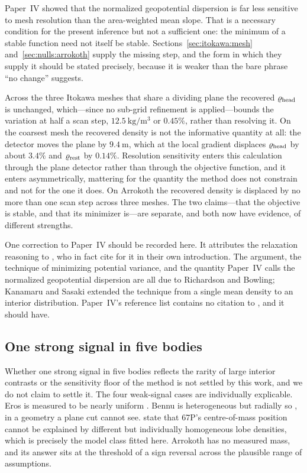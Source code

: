 Paper~IV showed that the normalized geopotential dispersion is far less
sensitive to mesh resolution than the area-weighted mean slope. That is a
necessary condition for the present inference but not a sufficient one: the
minimum of a stable function need not itself be stable.
Sections~\ref{sec:itokawa:mesh} and~\ref{sec:nulls:arrokoth} supply the
missing step, and the form in which they supply it should be stated
precisely, because it is weaker than the bare phrase ``no change'' suggests.

Across the three Itokawa meshes that share a dividing plane the recovered
$\varrho_{\mathrm{head}}$ is unchanged, which---since no sub-grid refinement is
applied---bounds the variation at half a scan step,
$\SI{12.5}{\kilo\gram\per\cubic\metre}$ or $0.45\%$, rather than resolving
it. On the coarsest mesh the recovered density is not the informative
quantity at all: the detector moves the plane by $\SI{9.4}{\metre}$, which
at the local gradient displaces $\varrho_{\mathrm{head}}$ by about $3.4\%$ and $\varrho_{\mathrm{rest}}$
by $0.14\%$. Resolution sensitivity enters this calculation through the
plane detector rather than through the objective function, and it enters
asymmetrically, mattering for the quantity the method does not constrain and
not for the one it does. On Arrokoth the recovered density is displaced by no
more than one scan step across three meshes. The two claims---that the
objective is stable, and that its minimizer is---are separate, and both now
have evidence, of different strengths.

One correction to Paper~IV should be recorded here. It attributes the
relaxation reasoning to \citet{kanamaru2019}, who in fact cite
\citet{richardson2014} for it in their own introduction. The argument, the
technique of minimizing potential variance, and the quantity Paper~IV calls
the normalized geopotential dispersion are all due to Richardson and
Bowling; Kanamaru and Sasaki extended the technique from a single mean
density to an interior distribution. Paper~IV's reference list contains no
citation to \citet{richardson2014}, and it should have.

\subsection{One strong signal in five bodies}
\label{sec:discussion:rate}

Whether one strong signal in five bodies reflects the rarity of large
interior contrasts or the sensitivity floor of the method is not settled by
this work, and we do not claim to settle it. The four weak-signal cases are
individually explicable. Eros is measured to be nearly uniform
\citep{yeomans2000,scheeres2020}. Bennu is heterogeneous but radially so
\citep{scheeres2020}, in a geometry a plane cut cannot see.
\citet{jorda2016} state that 67P's centre-of-mass position cannot be
explained by different but individually homogeneous lobe densities, which is
precisely the model class fitted here. Arrokoth has no measured mass, and
its answer sits at the threshold of a sign reversal across the plausible
range of assumptions.

